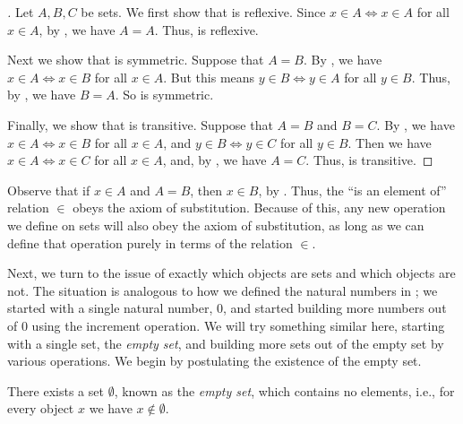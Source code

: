 \begin{proof}[]
  Let \(A, B, C\) be sets.
  We first show that  is reflexive.
  Since \(x \in A \iff x \in A\) for all \(x \in A\), by , we have \(A = A\).
  Thus,  is reflexive.

  Next we show that  is symmetric.
  Suppose that \(A = B\).
  By , we have \(x \in A \iff x \in B\) for all \(x \in A\).
  But this means \(y \in B \iff y \in A\) for all \(y \in B\).
  Thus, by , we have \(B = A\).
  So  is symmetric.

  Finally, we show that  is transitive.
  Suppose that \(A = B\) and \(B = C\).
  By , we have \(x \in A \iff x \in B\) for all \(x \in A\), and \(y \in B \iff y \in C\) for all \(y \in B\).
  Then we have \(x \in A \iff x \in C\) for all \(x \in A\), and, by , we have \(A = C\).
  Thus,  is transitive.
\end{proof}

\begin{note}
  Observe that if \(x \in A\) and \(A = B\), then \(x \in B\), by .
  Thus, the ``is an element of'' relation \(\in\) obeys the axiom of substitution.
  Because of this, any new operation we define on sets will also obey the axiom of substitution, as long as we can define that operation purely in terms of the relation \(\in\).
\end{note}

\begin{note}
  Next, we turn to the issue of exactly which objects are sets and which objects are not.
  The situation is analogous to how we defined the natural numbers in ;
  we started with a single natural number, \(0\), and started building more numbers out of \(0\) using the increment operation.
  We will try something similar here, starting with a single set, the \emph{empty set},
  and building more sets out of the empty set by various operations.
  We begin by postulating the existence of the empty set.
\end{note}

\begin{ax}\label{i:3.2}
  There exists a set \(\emptyset\), known as the \emph{empty set}, which contains no elements, i.e., for every object \(x\) we have \(x \notin \emptyset\).
\end{ax}

